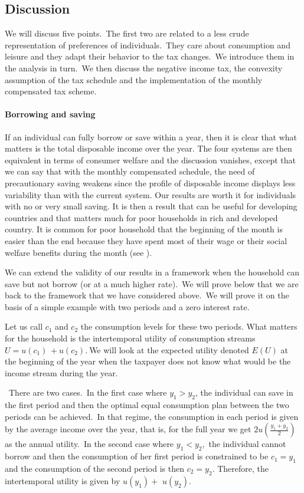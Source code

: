 \subsection{Discussion}

We will discuss five points.\ The first two are related to a less crude
representation of preferences of individuals.\ They care about consumption and
leisure and they adapt their behavior to the tax changes.\ We introduce them
in the analysis in turn.\ We then discuss the negative income tax, the
convexity assumption of the tax schedule and the implementation of the monthly
compensated tax scheme.\ 

\paragraph{Borrowing and saving}

If an individual can fully borrow or save within a year, then it is clear that
what matters is the total disposable income over the year. The four systems
are then equivalent in terms of consumer welfare and the discussion vanishes,
except that we can say that with the monthly compensated schedule, the need of
precautionary saving weakens since the profile of disposable income displays
less variability than with the current system. Our results are worth it for
individuals with no or very small saving. It is then a result that can be
useful for developing countries and that matters much for poor households in
rich and developed country. It is common for poor household that the beginning
of the month is easier than the end because they have spent most of their wage
or their social welfare benefits during the month (see \citet{hastings2010first}).

We can extend the validity of our results in a framework when the household
can save but not borrow (or at a much higher rate).\ We will prove below that
we are back to the framework that we have considered above.\ We will prove it
on the basis of a simple example with two periods and a zero interest rate.

Let us call $c_{1}$ and $c_{2}$ the consumption levels for these two periods.
What matters for the household is the intertemporal utility of consumption
streams $U=u(c_{1})\,+u(c_{2}).\ $We will look at the expected utility denoted
$E(U)$ at the beginning of the year when the taxpayer does not know what would
be the income stream during the year.\ 

\ There are two cases.\ In the first case where $y_{1}>y_{2}$, the individual
can save in the first period and then the optimal equal consumption plan
between the two periods can be achieved.\ In that regime, the consumption in
each period is given by the average income over the year, that is, for the
full year we get $2u(\frac{y_{1}+y_{2}}{2})$ as the annual utility.\ In the
second case where $y_{1}<y_{2},$ the individual cannot borrow and then the
consumption of her first period is constrained to be $c_{1}=y_{1}$ and the
consumption of the second period is then $c_{2}=y_{2}$. Therefore, the
intertemporal utility is given by $u(y_{1})+$ $u(y_{2}).$

